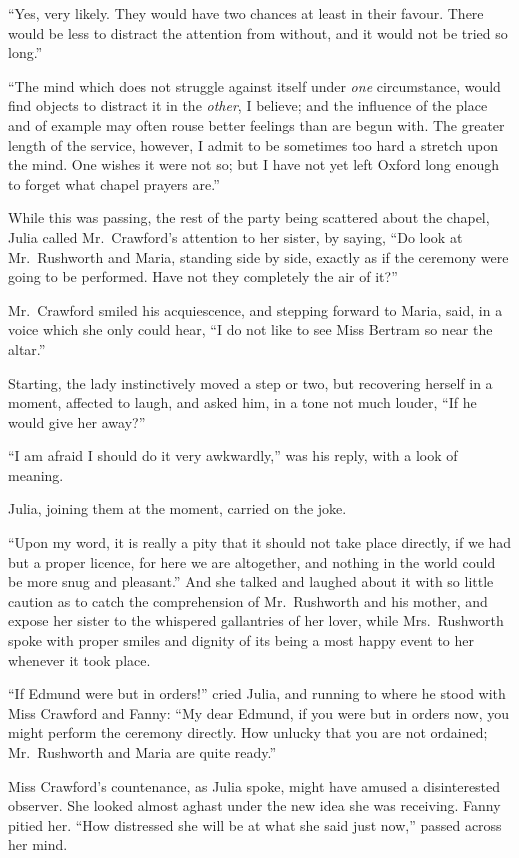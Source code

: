 \documentclass{article}
\begin{document}
``Yes, very likely.  They would have two chances at least
in their favour.  There would be less to distract the
attention from without, and it would not be tried so long.''

``The mind which does not struggle against itself under
\emph{one} circumstance, would find objects to distract it
in the \emph{other}, I believe; and the influence of the place
and of example may often rouse better feelings than are
begun with.  The greater length of the service, however,
I admit to be sometimes too hard a stretch upon the mind.
One wishes it were not so; but I have not yet left
Oxford long enough to forget what chapel prayers are.''

While this was passing, the rest of the party being scattered
about the chapel, Julia called Mr.\ Crawford's attention to
her sister, by saying, ``Do look at Mr.\ Rushworth and Maria,
standing side by side, exactly as if the ceremony were
going to be performed.  Have not they completely the air of it?''

Mr.\ Crawford smiled his acquiescence, and stepping forward
to Maria, said, in a voice which she only could hear,
``I do not like to see Miss Bertram so near the altar.''

Starting, the lady instinctively moved a step or two,
but recovering herself in a moment, affected to laugh,
and asked him, in a tone not much louder, ``If he would give
her away?''

``I am afraid I should do it very awkwardly,'' was his reply,
with a look of meaning.

Julia, joining them at the moment, carried on the joke.

``Upon my word, it is really a pity that it should not
take place directly, if we had but a proper licence,
for here we are altogether, and nothing in the world
could be more snug and pleasant.''  And she talked and
laughed about it with so little caution as to catch the
comprehension of Mr.\ Rushworth and his mother, and expose
her sister to the whispered gallantries of her lover,
while Mrs.\ Rushworth spoke with proper smiles and dignity
of its being a most happy event to her whenever it took place.

``If Edmund were but in orders!'' cried Julia, and running
to where he stood with Miss Crawford and Fanny:
``My dear Edmund, if you were but in orders now, you might
perform the ceremony directly.  How unlucky that you
are not ordained; Mr.\ Rushworth and Maria are quite ready.''

Miss Crawford's countenance, as Julia spoke, might have
amused a disinterested observer.  She looked almost aghast
under the new idea she was receiving.  Fanny pitied her.
``How distressed she will be at what she said just now,''
passed across her mind.
\end{document}
